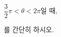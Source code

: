 $\dfrac{3}{2}\pi<\theta<2\pi$일 때, \par\smallskip\dispeq{$\sin\theta+\cos\theta+\tan\theta-|\sin\theta|-|\cos\theta|+|\tan\theta|$}\par\smallskip\noindent 를 간단히 하시오.
